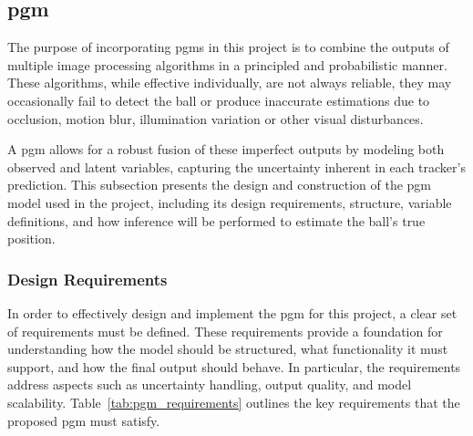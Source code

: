 \documentclass[12pt,a4paper]{article}
\begin{document}
\subsection{\acl{pgm}}
The purpose of incorporating \acp{pgm} in this project is to combine the outputs of multiple image processing algorithms in a principled and probabilistic manner. These algorithms, while effective individually, are not always reliable, they may occasionally fail to detect the ball or produce inaccurate estimations due to occlusion, motion blur, illumination variation or other visual disturbances. 

A \acs{pgm} allows for a robust fusion of these imperfect outputs by modeling both observed and latent variables, capturing the uncertainty inherent in each tracker’s prediction. This subsection presents the design and construction of the \acs{pgm} model used in the project, including its design requirements, structure, variable definitions, and how inference will be performed to estimate the ball's true position.

\subsubsection{Design Requirements}
In order to effectively design and implement the \acs{pgm} for this project, a clear set of requirements must be defined. These requirements provide a foundation for understanding how the model should be structured, what functionality it must support, and how the final output should behave. In particular, the requirements address aspects such as uncertainty handling, output quality, and model scalability. Table~\ref{tab:pgm_requirements} outlines the key requirements that the proposed \acs{pgm} must satisfy.
\end{document}
